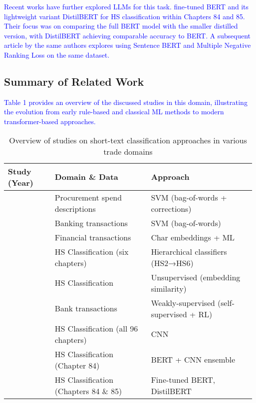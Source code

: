 \documentclass[mnsc,nonblindrev]{informs3} %
\begin{document}
\textcolor{blue}{Recent works have further explored LLMs for this task. \citet{Anggoro2023} fine-tuned BERT and its lightweight variant DistilBERT for HS classification within Chapters 84 and 85. Their focus was on comparing the full BERT model with the smaller distilled version, with DistilBERT achieving comparable accuracy to BERT. A subsequent article by the same authors explores using Sentence BERT and Multiple Negative Ranking Loss on the same dataset.}

\subsection{Summary of Related Work}
\textcolor{blue}{Table 1 provides an overview of the discussed studies in this domain, illustrating the evolution from early rule-based and classical ML methods to modern transformer-based approaches. }

\begin{table}[h]
    \centering
    \renewcommand{\arraystretch}{1.2} %
    \fontsize{7pt}{9pt}\selectfont    \begin{tabular}{l l l}
        \toprule
        \textbf{Study (Year)} & \textbf{Domain \& Data} & \textbf{Approach} \\
        \midrule
        \citet{mukherjee2008classifying} & Procurement spend descriptions & SVM (bag-of-words + corrections) \\
        \citet{garcia2020identifying} & Banking transactions & SVM (bag-of-words) \\
        \citet{jorgensen2021machine} & Financial transactions & Char embeddings + ML \\
        \citet{barbosaml2021} & HS Classification (six chapters) & Hierarchical classifiers (HS2→HS6) \\
        \citet{chenmachine2021} & HS Classification & Unsupervised (embedding similarity) \\
        \citet{toran2023scalable} & Bank transactions & Weakly-supervised (self-supervised + RL) \\
        \citet{Luppes2019} & HS Classification (all 96 chapters) & CNN \\
        \citet{He2021} & HS Classification (Chapter 84) & BERT + CNN ensemble \\
        \citet{Anggoro2023} & HS Classification (Chapters 84 \& 85) & Fine-tuned BERT, DistilBERT \\
        \bottomrule
    \end{tabular}
    \caption{Overview of studies on short-text classification approaches in various trade domains}
    \label{tab:classification_studies}
\end{table}
\end{document}
